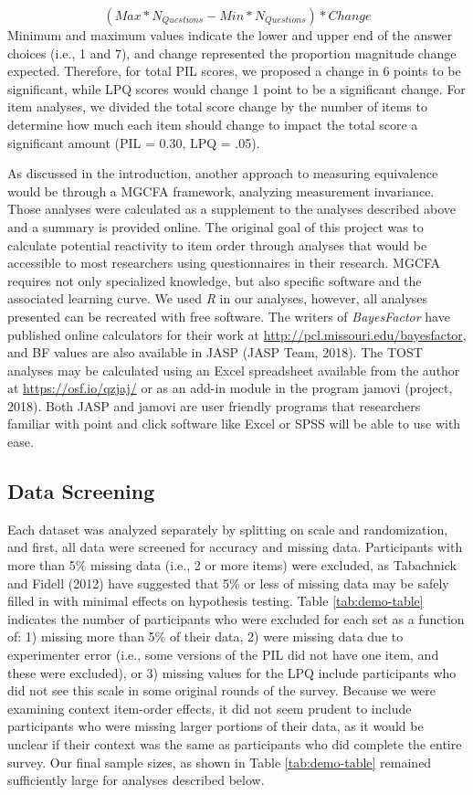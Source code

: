 \documentclass[english,man, mask]{apa6}
\theoremstyle{definition}
\theoremstyle{definition}
\theoremstyle{definition}
\theoremstyle{remark}
\begin{document}
\[
(Max*N_{Questions} - Min*N_{Questions}) * Change
\] Minimum and maximum values indicate the lower and upper end of the
answer choices (i.e., 1 and 7), and change represented the proportion
magnitude change expected. Therefore, for total PIL scores, we proposed
a change in 6 points to be significant, while LPQ scores would change 1
point to be a significant change. For item analyses, we divided the
total score change by the number of items to determine how much each
item should change to impact the total score a significant amount (PIL =
0.30, LPQ = .05).

As discussed in the introduction, another approach to measuring
equivalence would be through a MGCFA framework, analyzing measurement
invariance. Those analyses were calculated as a supplement to the
analyses described above and a summary is provided online. The original
goal of this project was to calculate potential reactivity to item order
through analyses that would be accessible to most researchers using
questionnaires in their research. MGCFA requires not only specialized
knowledge, but also specific software and the associated learning curve.
We used \emph{R} in our analyses, however, all analyses presented can be
recreated with free software. The writers of \emph{BayesFactor} have
published online calculators for their work at
\url{http://pcl.missouri.edu/bayesfactor}, and BF values are also
available in JASP (JASP Team, 2018). The TOST analyses may be calculated
using an Excel spreadsheet available from the author at
\url{https://osf.io/qzjaj/} or as an add-in module in the program jamovi
(project, 2018). Both JASP and jamovi are user friendly programs that
researchers familiar with point and click software like Excel or SPSS
will be able to use with ease.

\subsection{Data Screening}\label{data-screening}

Each dataset was analyzed separately by splitting on scale and
randomization, and first, all data were screened for accuracy and
missing data. Participants with more than 5\% missing data (i.e., 2 or
more items) were excluded, as Tabachnick and Fidell (2012) have
suggested that 5\% or less of missing data may be safely filled in with
minimal effects on hypothesis testing. Table \ref{tab:demo-table}
indicates the number of participants who were excluded for each set as a
function of: 1) missing more than 5\% of their data, 2) were missing
data due to experimenter error (i.e., some versions of the PIL did not
have one item, and these were excluded), or 3) missing values for the
LPQ include participants who did not see this scale in some original
rounds of the survey. Because we were examining context item-order
effects, it did not seem prudent to include participants who were
missing larger portions of their data, as it would be unclear if their
context was the same as participants who did complete the entire survey.
Our final sample sizes, as shown in Table \ref{tab:demo-table} remained
sufficiently large for analyses described below.
\end{document}
